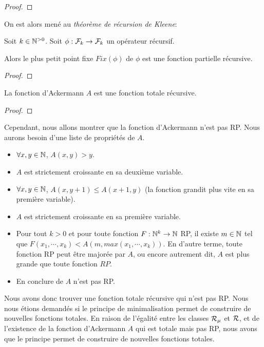 \ifdefined\outputproof
\begin{proof}

\end{proof}
\fi

On est alors mené au \textit{théorème de récursion de Kleene}:

\begin{theorem}
	\label{theorem:kleene_recursion}
	Soit $k \in \mathbb{N}^{> 0}$.
	Soit $\phi : \mathcal{F}_{k} \rightarrow \mathcal{F}_{k}$ un opérateur
	récursif.

	Alors le plus petit point fixe $Fix(\phi)$ de $\phi$ est une fonction partielle récursive.
\end{theorem}

\ifdefined\outputproof
\begin{proof}

\end{proof}
\fi

\begin{corollary}
	\label{corollary:ackermann_total_recursive}
	La fonction d'Ackermann $A$ est une fonction totale récursive.
\end{corollary}

\ifdefined\outputproof
\begin{proof}

\end{proof}
\fi

Cependant, nous allons montrer que la fonction d'Ackermann n'est pas RP. Nous
aurons besoin d'une liste de propriétés de $A$.

\begin{proposition}
	\begin{itemize}
		\item $\forall x, y \in \mathbb{N}$, $A(x, y) > y$.
		\item $A$ est strictement croissante en sa deuxième variable.
		\item $\forall x, y \in \mathbb{N}$, $A(x, y + 1) \leq A(x + 1, y)$ (la
			fonction grandit plus vite en sa première variable).
		\item $A$ est strictement croissante en sa première variable.
		\item Pour tout $k > 0$ et pour toute fonction
			$F : \mathbb{N}^{k} \rightarrow \mathbb{N}$ RP, il existe $m \in \mathbb{N}$
			tel que $F(x_{1}, \cdots, x_{k}) < A(m, max(x_{1}, \cdots, x_{k}))$.
			En d'autre terme, toute fonction RP peut être majorée par $A$, ou
			encore autrement dit, $A$ est plus grande que toute fonction $RP$.
		\item En conclure de $A$ n'est pas RP.
	\end{itemize}
\end{proposition}

Nous avons donc trouver une fonction totale récursive qui n'est pas RP. Nous
nous étions demandés si le principe de minimalisation permet de construire de
nouvelles fonctions totales. En raison de l'égalité entre les classes
$\mathcal{R}_{\mu}$ et $\mathcal{R}$, et de l'existence de la
fonction d'Ackermann $A$ qui est totale mais pas RP, nous avons que le principe
permet de construire de nouvelles fonctions totales.

